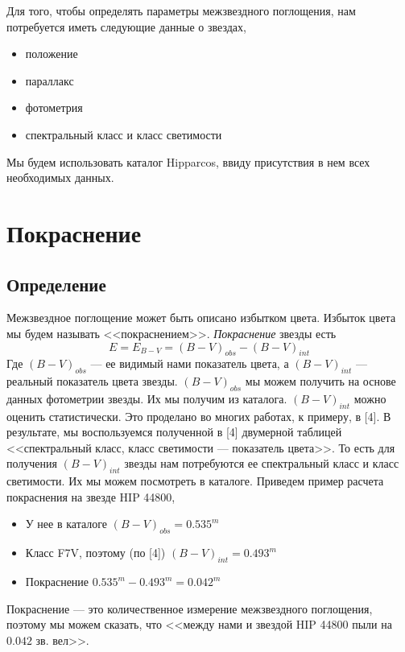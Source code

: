 \documentclass[14pt]{article}
\begin{document}
        Для того, чтобы определять параметры межзвездного поглощения, нам потребуется иметь следующие данные о звездах,  
        \begin{itemize}
            \item положение
            \item параллакс 
            \item фотометрия 
            \item спектральный класс и класс светимости
        \end{itemize}
        Мы будем использовать каталог Hipparcos, ввиду присутствия в нем всех необходимых данных. 
    
    
    \section{Покраснение}
    
    
        \subsection{Определение}
            Межзвездное поглощение может быть описано избытком цвета. Избыток цвета мы будем называть <<покраснением>>. {\it Покраснение} звезды есть
        		$$
            		E = E_{B - V} = (B - V)_{obs} - (B - V)_{int}    
        		$$ 
            Где $(B - V)_{obs}$ --- ее видимый нами показатель цвета, а $(B - V)_{int}$ --- реальный показатель цвета звезды. $(B - V)_{obs}$ мы можем получить на основе данных фотометрии звезды. Их мы получим из каталога. $(B - V)_{int}$ можно оценить статистически. Это проделано во многих работах, к примеру, в [4]. В результате, мы воспользуемся полученной в [4] двумерной таблицей <<спектральный класс, класс светимости --- показатель цвета>>. То есть для получения $(B - V)_{int}$ звезды нам потребуются ее спектральный класс и класс светимости. Их мы можем посмотреть в каталоге. Приведем пример расчета покраснения на звезде HIP 44800,
        		\begin{itemize}
            		\item У нее в каталоге $(B - V)_{obs} = 0.535^m$
            		\item Класс F7V, поэтому (по [4]) $(B - V)_{int} = 0.493^m$
            		\item Покраснение $0.535^m - 0.493^m = 0.042^m$
        		\end{itemize}
        		Покраснение --- это количественное измерение межзвездного поглощения, поэтому мы можем сказать, что <<между нами и звездой HIP 44800 пыли на $0.042$ зв. вел>>.
        
\end{document}
